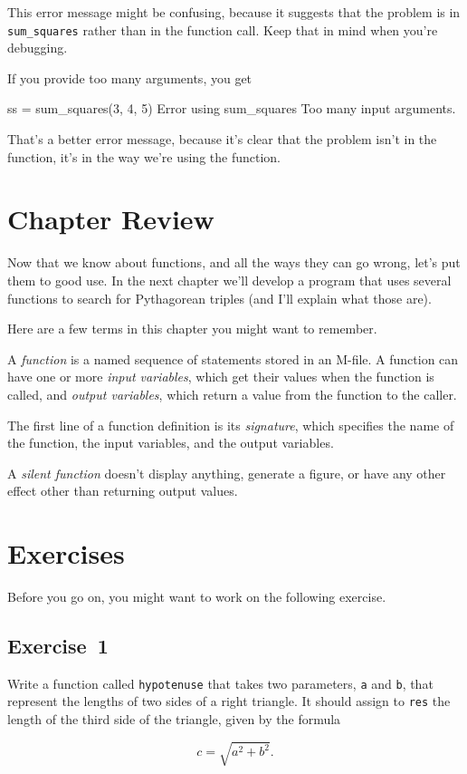 This error message might be confusing, because it suggests that
the problem is in \lstinline{sum_squares} rather than in the function call.
Keep that in mind when you're debugging.

If you provide too many arguments, you get

\begin{code}
ss = sum_squares(3, 4, 5)
Error using sum_squares
Too many input arguments.
\end{code}

That's a better error message, because it's clear that the problem isn't in the function, it's in the way we're using the function.

\section{Chapter Review}

Now that we know about functions, and all the ways they can go wrong, let's put them to good use.  In the next chapter we'll develop a program that uses several functions to search for Pythagorean triples (and I'll explain what those are).

Here are a few terms in this chapter you might want to remember.

A {\em function} is a named sequence of statements stored in an M-file.
A function can have one or more {\em input variables}, which get their values when the function is called, and {\em output variables}, which return a value from the function to the caller.

The first line of a function definition is its {\em signature}, which
specifies the name of the function, the input variables, and the
output variables.

A {\em silent function} doesn't display anything, generate a figure, or have any other effect other than returning output values.


\section{Exercises}

Before you go on, you might want to work on the following exercise.
\subsection{Exercise~1}
\label{hypotenuse_exercise}
Write a function called \lstinline{hypotenuse} that takes two parameters, \lstinline{a} and \lstinline{b}, that represent the lengths of two sides of a right triangle.  It should assign to \lstinline{res} the length of the third side of the triangle, given by the formula

\[ c = \sqrt{a^2 + b^2}. \]

